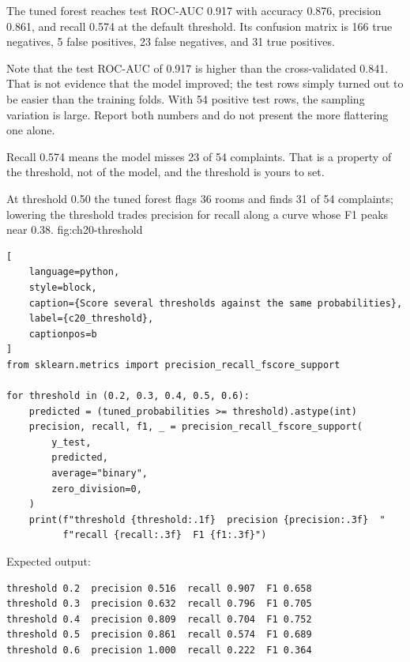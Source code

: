 The tuned forest reaches test ROC-AUC 0.917 with accuracy 0.876, precision
0.861, and recall 0.574 at the default threshold. Its confusion matrix is 166
true negatives, 5 false positives, 23 false negatives, and 31 true positives.

Note that the test ROC-AUC of 0.917 is higher than the cross-validated 0.841.
That is not evidence that the model improved; the test rows simply turned out to
be easier than the training folds. With 54 positive test rows, the sampling
variation is large. Report both numbers and do not present the more flattering
one alone.

\label{sec:c20-threshold}

Recall 0.574 means the model misses 23 of 54 complaints. That is a property of
the threshold, not of the model, and the threshold is yours to set.

{At threshold 0.50 the tuned forest flags 36 rooms and finds 31 of 54 complaints; lowering the threshold trades precision for recall along a curve whose F1 peaks near 0.38.}
{fig:ch20-threshold}

\begin{lstlisting}[
    language=python,
    style=block,
    caption={Score several thresholds against the same probabilities},
    label={c20_threshold},
    captionpos=b
]
from sklearn.metrics import precision_recall_fscore_support

for threshold in (0.2, 0.3, 0.4, 0.5, 0.6):
    predicted = (tuned_probabilities >= threshold).astype(int)
    precision, recall, f1, _ = precision_recall_fscore_support(
        y_test,
        predicted,
        average="binary",
        zero_division=0,
    )
    print(f"threshold {threshold:.1f}  precision {precision:.3f}  "
          f"recall {recall:.3f}  F1 {f1:.3f}")
\end{lstlisting}

Expected output:

\begin{lstlisting}[language=text, style=block, caption={One model, five classifiers}, label={c20_threshold_output}, captionpos=b]
threshold 0.2  precision 0.516  recall 0.907  F1 0.658
threshold 0.3  precision 0.632  recall 0.796  F1 0.705
threshold 0.4  precision 0.809  recall 0.704  F1 0.752
threshold 0.5  precision 0.861  recall 0.574  F1 0.689
threshold 0.6  precision 1.000  recall 0.222  F1 0.364
\end{lstlisting}

